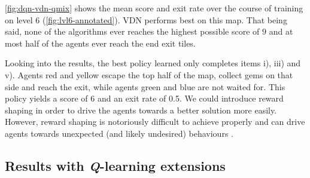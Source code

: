 \autoref{fig:dqn-vdn-qmix} shows the mean score and exit rate over the course of training on level 6 (\autoref{fig:lvl6-annotated}). VDN performs best on this map. That being said, none of the algorithms ever reaches the highest possible score of $9$ and at most half of the agents ever reach the end exit tiles.

Looking into the results, the best policy learned only completes items i), iii) and v). Agents red and yellow escape the top half of the map, collect gems on that side and reach the exit, while agents green and blue are not waited for. This policy yields a score of 6 and an exit rate of 0.5. We could introduce reward shaping in order to drive the agents towards a better solution more easily. However, reward shaping is notoriously difficult to achieve properly and can drive agents towards unexpected (and likely undesired) behaviours \citep{amodei_2016_reward}.

\subsection{Results with \textit{Q}-learning extensions}
\label{sec:results-extensions}

